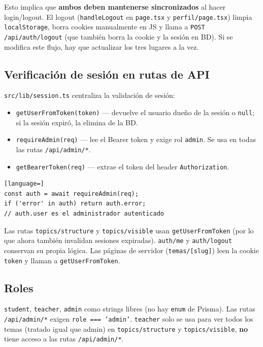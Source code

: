 \documentclass[11pt,a4paper]{article}
\newcommand{\code}[1]{\texttt{#1}}
\begin{document}
Esto implica que \textbf{ambos deben mantenerse sincronizados} al hacer login/logout. El logout (\code{handleLogout} en \code{page.tsx} y \code{perfil/page.tsx}) limpia \code{localStorage}, borra cookies manualmente en JS y llama a \code{POST /api/auth/logout} (que también borra la cookie y la sesión en BD). Si se modifica este flujo, hay que actualizar los tres lugares a la vez.

\subsection{Verificación de sesión en rutas de API}

\code{src/lib/session.ts} centraliza la validación de sesión:

\begin{itemize}
  \item \code{getUserFromToken(token)} --- devuelve el usuario dueño de la sesión o \code{null}; si la sesión expiró, la elimina de la BD.
  \item \code{requireAdmin(req)} --- lee el Bearer token y exige rol \code{admin}. Se usa en todas las rutas \code{/api/admin/*}.
  \item \code{getBearerToken(req)} --- extrae el token del header \code{Authorization}.
\end{itemize}

\begin{lstlisting}[language=]
const auth = await requireAdmin(req);
if ('error' in auth) return auth.error;
// auth.user es el administrador autenticado
\end{lstlisting}

Las rutas \code{topics/structure} y \code{topics/visible} usan \code{getUserFromToken} (por lo que ahora también invalidan sesiones expiradas). \code{auth/me} y \code{auth/logout} conservan su propia lógica. Las páginas de servidor (\code{temas/[slug]}) leen la cookie \code{token} y llaman a \code{getUserFromToken}.

\subsection{Roles}

\code{student}, \code{teacher}, \code{admin} como strings libres (no hay \code{enum} de Prisma). Las rutas \code{/api/admin/*} exigen \code{role === 'admin'}. \code{teacher} solo se usa para ver todos los temas (tratado igual que admin) en \code{topics/structure} y \code{topics/visible}, \textbf{no} tiene acceso a las rutas \code{/api/admin/*}.
\end{document}
